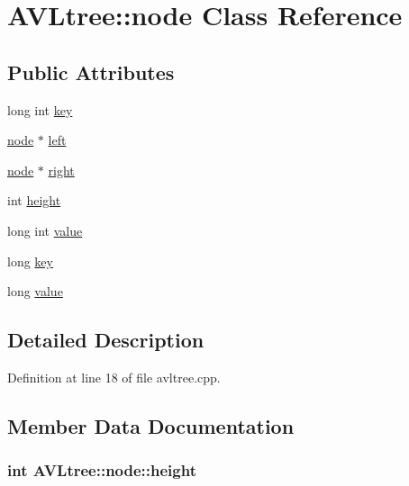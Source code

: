 \hypertarget{struct_a_v_ltree_1_1node}{\section{A\-V\-Ltree\-:\-:node Class Reference}
\label{struct_a_v_ltree_1_1node}
}
\subsection*{Public Attributes}
\begin{DoxyCompactItemize}
\item 
long int \hyperlink{struct_a_v_ltree_1_1node_a773a32aca2eecc03384239236f5bb6bf}{key}
\item 
\hyperlink{struct_a_v_ltree_1_1node}{node} $\ast$ \hyperlink{struct_a_v_ltree_1_1node_ab7fd8235f42249a50639628375c9fc53}{left}
\item 
\hyperlink{struct_a_v_ltree_1_1node}{node} $\ast$ \hyperlink{struct_a_v_ltree_1_1node_ab0c7985a54e707daeca69540e281c715}{right}
\item 
int \hyperlink{struct_a_v_ltree_1_1node_aa4b4ac2c87a71d0210c728001e9e309c}{height}
\item 
long int \hyperlink{struct_a_v_ltree_1_1node_a07a4c51fe0378bd7c523fbfe1c0d8ecc}{value}
\item 
long \hyperlink{struct_a_v_ltree_1_1node_af9249c77ccf64046f71f61ec7e9cf3f4}{key}
\item 
long \hyperlink{struct_a_v_ltree_1_1node_ad193d6c64cf315f35c953f1e19830a6a}{value}
\end{DoxyCompactItemize}


\subsection{Detailed Description}


Definition at line 18 of file avltree.\-cpp.



\subsection{Member Data Documentation}
\hypertarget{struct_a_v_ltree_1_1node_aa4b4ac2c87a71d0210c728001e9e309c}{
\subsubsection[{height}]{\setlength{\rightskip}{0pt plus 5cm}int A\-V\-Ltree\-::node\-::height}}\label{struct_a_v_ltree_1_1node_aa4b4ac2c87a71d0210c728001e9e309c}



